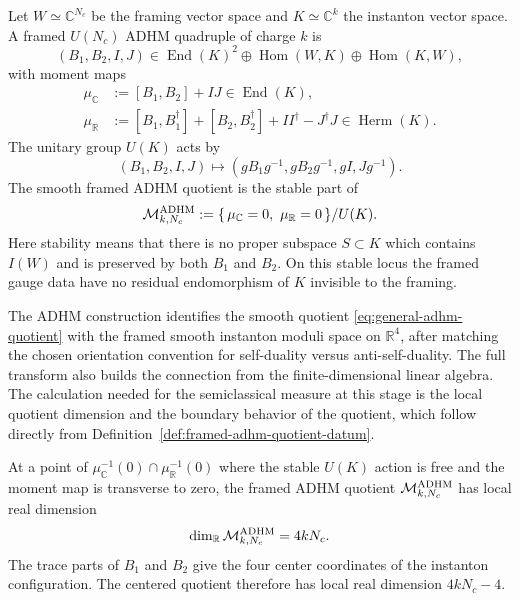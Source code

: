 \begin{definition}
\label{def:framed-adhm-quotient-datum}
Let \(W\simeq\mathbb C^{N_c}\) be the framing vector space and
\(K\simeq\mathbb C^k\) the instanton vector space.  A framed \(U(N_c)\)
ADHM quadruple of charge \(k\) is
\[
  (B_1,B_2,I,J)
  \in
  \operatorname{End}(K)^2
  \oplus\operatorname{Hom}(W,K)
  \oplus\operatorname{Hom}(K,W),
\]
with moment maps
\begin{align}
  \mu_{\mathbb C}
  &:=
  [B_1,B_2]+IJ
  \in\operatorname{End}(K),
  \nonumber\\
  \mu_{\mathbb R}
  &:=
  [B_1,B_1^\dagger]+[B_2,B_2^\dagger]
  +II^\dagger-J^\dagger J
  \in\operatorname{Herm}(K).
  \label{eq:general-adhm-moment-maps}
\end{align}
The unitary group \(U(K)\) acts by
\begin{equation}
  (B_1,B_2,I,J)
  \longmapsto
  (gB_1g^{-1},gB_2g^{-1},gI,Jg^{-1}).
  \label{eq:general-adhm-unitary-action}
\end{equation}
The smooth framed ADHM quotient is the stable part of
\begin{equation}
  \mathcal M_{k,N_c}^{\rm ADHM}
  :=
  \{\,\mu_{\mathbb C}=0,\ \mu_{\mathbb R}=0\,\}/U(K).
  \label{eq:general-adhm-quotient}
\end{equation}
Here stability means that there is no proper subspace
\(S\subset K\) which contains \(I(W)\) and is preserved by both \(B_1\) and
\(B_2\).  On this stable locus the framed gauge data have no residual
endomorphism of \(K\) invisible to the framing.
\end{definition}

The ADHM construction identifies the smooth quotient
\eqref{eq:general-adhm-quotient} with the framed smooth instanton moduli
space on \(\mathbb R^4\), after matching the chosen orientation convention
for self-duality versus anti-self-duality.  The full transform also builds
the connection from the finite-dimensional linear algebra.  The calculation
needed for the semiclassical measure at this stage is the local quotient
dimension and the boundary behavior of the quotient, which follow directly
from Definition~\ref{def:framed-adhm-quotient-datum}.

\begin{proposition}
\label{prop:adhm-quotient-dimension-count}
At a point of \(\mu_{\mathbb C}^{-1}(0)\cap\mu_{\mathbb R}^{-1}(0)\) where
the stable \(U(K)\) action is free and the moment map is transverse to zero,
the framed ADHM quotient
\(\mathcal M_{k,N_c}^{\rm ADHM}\) has local real dimension
\[
  \dim_\mathbb R\mathcal M_{k,N_c}^{\rm ADHM}=4kN_c .
\]
The trace parts of \(B_1\) and \(B_2\) give the four center coordinates of
the instanton configuration.  The centered quotient therefore has local real
dimension \(4kN_c-4\).
\end{proposition}

